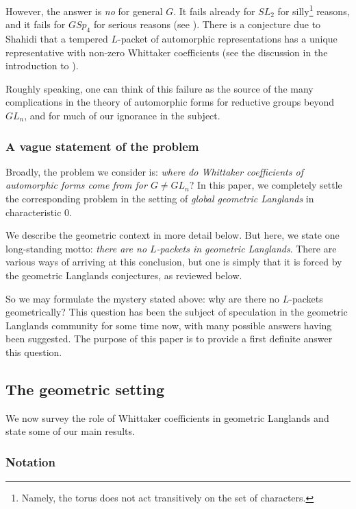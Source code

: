 \documentclass[reqno,11pt]{amsart}
\numberwithin{equation}{subsection}
\theoremstyle{remark}
\begin{document}
However, the answer is \emph{no} for general $G$. It fails already for $SL_2$ 
for silly\footnote{Namely, the torus does not act transitively on the set of
characters.} reasons, and it fails for $GSp_4$ for serious reasons
(see \cite{howe-ps}). There is a conjecture
due to Shahidi that a 
tempered $L$-packet of automorphic representations has a unique
representative with non-zero Whittaker coefficients 
(see the discussion in the introduction to \cite{shahidi-arthur}). 

Roughly speaking, one can think of this failure as the source
of the many complications in the theory of automorphic forms
for reductive groups beyond $GL_n$, and for much of our ignorance
in the subject.

\subsubsection{A vague statement of the problem}

Broadly, the problem we consider is: \emph{where do Whittaker coefficients of 
automorphic forms come from for $G \neq GL_n$}?
In this paper, we
completely settle the corresponding problem in the setting of
\emph{global geometric Langlands} in characteristic $0$.

We describe the geometric context in more detail below.
But here, we state one long-standing motto: \emph{there
are no $L$-packets in geometric Langlands}. There are 
various ways of arriving at this conclusion, but one is simply 
that it is forced by the geometric Langlands conjectures, 
as reviewed below. 

So we may formulate the mystery stated above: why are there
no $L$-packets geometrically? This question has been the subject
of speculation in the geometric Langlands community for some time
now, with many possible answers having been suggested. 
The purpose of this paper is to provide a first definite answer this question. 

\subsection{The geometric setting}

We now survey the role of Whittaker coefficients in geometric Langlands
and state some of our main results.

\subsubsection{Notation}
\end{document}
